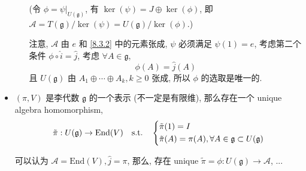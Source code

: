 \begin{itemize}
\begin{tcolorbox}[title=proof:]
\begin{itemize}
			(令 $\phi = \psi \big|_{U(\mathfrak{g})}$, 有 $\ker(\psi) = J \oplus \ker(\phi)$, 即 $\mathcal{A} = T(\mathfrak{g}) / \ker(\psi) = U(\mathfrak{g}) / \ker(\phi)$.)
			
			\noindent\hdashrule[0.5ex]{\linewidth}{0.5pt}{1mm} %
			
			注意, $\mathcal{A}$ 由 $e$ 和 \eqref{8.3.2} 中的元素张成, $\psi$ 必须满足 $\psi(1) = e$, 考虑第二个条件 $\phi \circ \hat{i} = \hat{j}$, 考虑 $\forall A \in \mathfrak{g}$,
			\begin{equation}
				\phi(A) = \hat{j}(A)
			\end{equation}
			且 $U(\mathfrak{g})$ 由 $A_1 \oplus \cdots \oplus A_k, k \geq 0$ 张成, 所以 $\phi$ 的选取是唯一的.
		\end{itemize}
	\end{tcolorbox}
	
	\item $(\pi, V)$ 是李代数 $\mathfrak{g}$ 的一个表示 (不一定是有限维), 那么存在一个 unique algebra homomorphism,
	\begin{equation} \label{8.3.10}
		\tilde{\pi} : U(\mathfrak{g}) \rightarrow \mathrm{End}(V) \quad \text{s.t.} \quad \begin{dcases}
			\tilde{\pi}(1) = I \\
			\tilde{\pi}(A) = \pi(A), \forall A \in \mathfrak{g} \subset U(\mathfrak{g})
		\end{dcases}
	\end{equation}
	
	\begin{tcolorbox}[title=proof:]
		可以认为 $\mathcal{A} = \mathrm{End}(V), \hat{j} = \pi$, 那么, 存在 unique $\tilde{\pi} = \phi : U(\mathfrak{g}) \rightarrow \mathcal{A}$, ...
	\end{tcolorbox}
\end{itemize}

